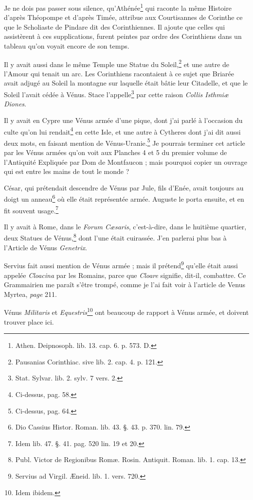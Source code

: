 \documentclass[a4paper, 11pt, oneside, polutonikogreek, french]{article}
\begin{document}
Je ne dois pas passer sous silence, qu'Athénée\footnote{Athen. Deipnosoph. lib. 13. cap. 6. p. 573. D.} qui raconte la même Histoire d'après Théopompe et d'après Timée, attribue aux Courtisannes de Corinthe ce que le Scholiaste de Pindare dit des Corinthiennes. Il ajoute que celles qui assistèrent à ces supplications, furent peintes par ordre des Corinthiens dans un tableau qu'on voyait encore de son temps.

Il y avait aussi dans le même Temple une Statue du Soleil,\footnote{Pausanias Corinthiac. sive lib. 2. cap. 4. p. 121.} et une autre de l'Amour qui tenait un arc. Les Corinthiens racontaient à ce sujet que Briarée avait adjugé au Soleil la montagne sur laquelle était bâtie leur Citadelle, et que le Soleil l'avait cédée à Vénus. Stace l'appelle\footnote{Stat. Sylvar. lib. 2. sylv. 7 vers. 2.} par cette raison \emph{Collis Isthmiæ Diones}.

Il y avait en Cypre une Vénus armée d'une pique, dont j'ai parlé à l'occasion du culte qu'on lui rendait\footnote{Ci-dessus, pag. 58.} en cette Isle, et une autre à Cytheres dont j'ai dit aussi deux mots, en faisant mention de Vénus-Uranie.\footnote{Ci-dessus, pag. 64.} Je pourrais terminer cet article par les Vénus armées qu'on voit aux Planches 4 et 5 du premier volume de l'Antiquité Expliquée par Dom de Montfaucon ; mais pourquoi copier un ouvrage qui est entre les mains de tout le monde ?

César, qui prétendait descendre de Vénus par Jule, fils d'Enée, avait toujours au doigt un anneau\footnote{Dio Cassius Histor. Roman. lib. 43. §. 43. p. 370. lin. 79.} où elle était représentée armée. Auguste le porta ensuite, et en fit souvent usage.\footnote{Idem lib. 47. §. 41. pag. 520 lin. 19 et 20.}

Il y avait à Rome, dans le \emph{Forum Cæsaris}, c'est-à-dire, dans le huitième quartier, deux Statues de Vénus,\footnote{Publ. Victor de Regionibus Romæ. Rosin. Antiquit. Roman. lib. 1. cap. 13.} dont l'une était cuirassée. J'en parlerai plus bas à l'Article de Vénus \emph{Genetrix}.

Servius fait aussi mention de Vénus armée ; mais il prétend\footnote{Servius ad Virgil. Æneid. lib. 1. vers. 720.} qu'elle était aussi appelée \emph{Cloacina} par les Romains, parce que \emph{Cloare} signifie, dit-il, combattre. Ce Grammairien me paraît s'être trompé, comme je l'ai fait voir à l'article de Venus Myrtea, \emph{page} 211.

Vénus \emph{Militaris} et \emph{Equestris}\footnote{Idem ibidem.} ont beaucoup de rapport à Vénus armée, et doivent trouver place ici.
\end{document}
